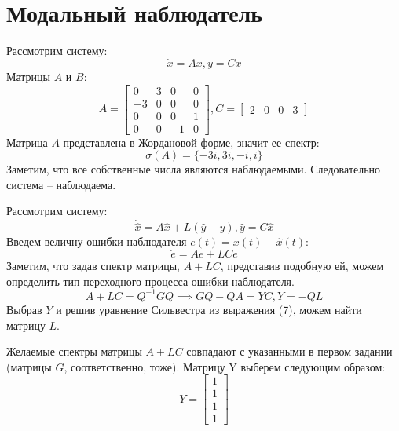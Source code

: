 \section{Модальный наблюдатель}
Рассмотрим систему:
\begin{equation}
    \dot{x} = Ax, y = Cx
\end{equation}
Матрицы $A$ и $B$:
\begin{equation*}
    A = \begin{bmatrix}
        0 & 3 & 0 & 0 \\
        -3 & 0 & 0 & 0 \\
        0 & 0 & 0 & 1 \\
        0 & 0 & -1 & 0
    \end{bmatrix},
    C = \begin{bmatrix}
        2 & 0 & 0 & 3
    \end{bmatrix}
\end{equation*}
Матрица $A$ представлена в Жордановой форме, значит ее спектр:
\begin{equation*}
    \sigma (A) = \{-3i,3i,-i,i\}
\end{equation*}
Заметим, что все собственные числа являются наблюдаемыми. Следовательно система -- наблюдаема.

Рассмотрим систему:
\begin{equation}
    \dot{\hat x} = A\hat x + L(\hat y - y), \hat y = C\hat x
\end{equation}
Введем величну ошибки наблюдателя $e(t)=x(t)-\hat x(t)$:
\begin{equation}
    \dot e = Ae + LCe
\end{equation}
Заметим, что задав спектр матрицы, $A + LC$, представив подобную ей, можем определить тип переходного процесса ошибки наблюдателя.
\begin{equation}
    A+LC = Q^{-1}GQ \implies GQ - QA = YC, Y = -QL 
\end{equation}
Выбрав $Y$ и решив уравнение Сильвестра из выражения (7), можем найти матрицу $L$.

Желаемые спектры матрицы $A + LC$ совпадают с указанными в первом задании (матрицы $G$, соответственно, тоже).
Матрицу Y выберем следующим образом:
\begin{equation*}
    Y = \begin{bmatrix}
        1 \\ 1 \\ 1 \\ 1
    \end{bmatrix}
\end{equation*}


